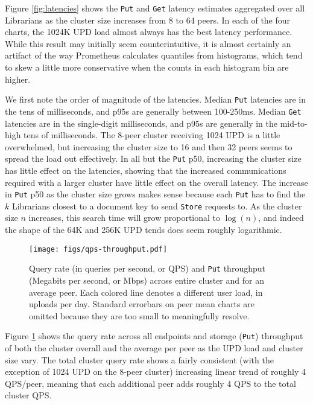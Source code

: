 \documentclass[10pt]{article}
\newcommand{\ttt}[1]{\texttt{#1}}
\def\Put{\ttt{Put}}
\begin{document}
Figure \ref{fig:latencies} shows the \ttt{Put} and \texttt{Get} latency estimates aggregated over all Librarians as the cluster size increases from 8 to 64 peers. In each of the four charts, the 1024K UPD load almost always has the best latency performance. While this result may initially seem counterintuitive, it is almost certainly an artifact of the way Prometheus calculates quantiles from histograms, which tend to skew a little more conservative when the counts in each histogram bin are higher. 

We first note the order of magnitude of the latencies. Median \ttt{Put} latencies are in the tens of milliseconds, and p95s are generally between 100-250ms. Median \texttt{Get} latencies are in the single-digit milliseconds, and p95s are generally in the mid-to-high tens of milliseconds. The 8-peer cluster receiving 1024 UPD is a little overwhelmed, but increasing the cluster size to 16 and then 32 peers seems to spread the load out effectively. In all but the \texttt{Put} p50, increasing the cluster size has little effect on the latencies, showing that the increased communications required with a larger cluster have little effect on the overall latency. The increase in \texttt{Put} p50 as the cluster size grows makes sense because each \texttt{Put} has to find the $k$ Librarians closest to a document key to send \texttt{Store} requests to. As the cluster size $n$ increases, this search time will grow proportional to $\log(n)$, and indeed the shape of the 64K and 256K UPD tends does seem roughly logarithmic. 

\begin{figure}[t]
	\centering
	\texttt{[image: figs/qps-throughput.pdf]}
	\caption{Query rate (in queries per second, or QPS) and \Put{} throughput (Megabits per second, or Mbps) across entire cluster and for an average peer. Each colored line denotes a different user load, in uploads per day. Standard errorbars on peer mean charts are omitted because they are too small to meaningfully resolve.}
	\label{fig:ratethroughput}
\end{figure}

Figure \ref{fig:ratethroughput} shows the query rate across all endpoints and storage (\Put{}) throughput of both the cluster overall and the average per peer as the UPD load and cluster size vary. The total cluster query rate shows a fairly consistent (with the exception of 1024 UPD on the 8-peer cluster) increasing linear trend of roughly 4 QPS/peer, meaning that each additional peer adds roughly 4 QPS to the total cluster QPS.
\end{document}
